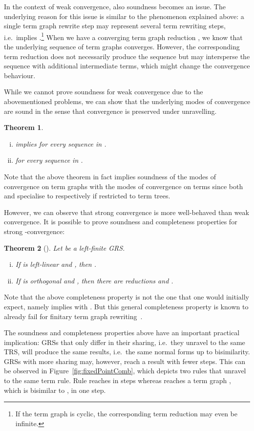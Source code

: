 \documentclass[copyright,creativecommons,UKenglish,final]{eptcs}
\theoremstyle{definition}
\theoremstyle{plain}
\newtheorem{theorem}{Theorem}[section]
\begin{document}
In the context of weak convergence, also soundness becomes an
issue. The underlying reason for this issue is similar to the
phenomenon explained above: a single term graph rewrite step may
represent several term rewriting steps, i.e.\  implies
.\footnote{If the term graph 
  is cyclic, the corresponding term reduction may even be infinite.}
When we have a converging term graph reduction , we know that the underlying
sequence of term graphs 
converges. However, the corresponding term reduction does not
necessarily produce the sequence
 but may intersperse the
sequence  with additional
intermediate terms, which might change the convergence behaviour.

While we cannot prove soundness for weak convergence due to the
abovementioned problems, we can show that the underlying modes of
convergence are sound in the sense that convergence is preserved under
unravelling.
\begin{theorem}
  \label{thr:unravLim}
  \quad
  \begin{enumerate}[(i)]
  \item  implies
     for every
    sequence  in .
  \item  for every sequence
     in .
  \end{enumerate}
\end{theorem}
Note that the above theorem in fact implies soundness of the modes of
convergence on term graphs with the modes of convergence on terms
since both  and  specialise to  respectively
 if restricted to term trees.

However, we can observe that strong convergence is more well-behaved
than weak convergence. It is possible to prove soundness and
completeness properties for strong -convergence:
\begin{theorem}[\cite{bahr12rta}]
  \label{thr:pConvSoundCompl}
  Let  be a left-finite GRS.
  \begin{enumerate}[(i)]
  \item If  is left-linear and , then
    .
  \item If  is orthogonal and ,
    then there are reductions  and .
  \end{enumerate}
\end{theorem}
Note that the above completeness property is not the one that one
would initially expect, namely 
implies  with . But this general
completeness property is known to already fail for finitary term graph
rewriting~\cite{kennaway94toplas}.

The soundness and completeness properties above have an important
practical implication: GRSs that only differ in their sharing, i.e.\
they unravel to the same TRS, will produce the same results, i.e.\ the
same normal forms up to bisimilarity. GRSs with more sharing may,
however, reach a result with fewer steps. This can be observed in
Figure~\ref{fig:fixedPointComb}, which depicts two rules  that unravel to the same term rule. Rule  reaches
 in  steps whereas  reaches a term graph
, which is bisimilar to , in one step.
\end{document}
